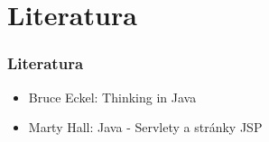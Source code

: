 \documentclass{beamer}
\begin{document}
\section*{Literatura}

\begin{frame}
	\frametitle{Literatura}
	\begin{itemize}
		\item Bruce Eckel: Thinking in Java
		\item Marty Hall: Java - Servlety a stránky JSP
	\end{itemize}
\end{frame}
\end{document}
